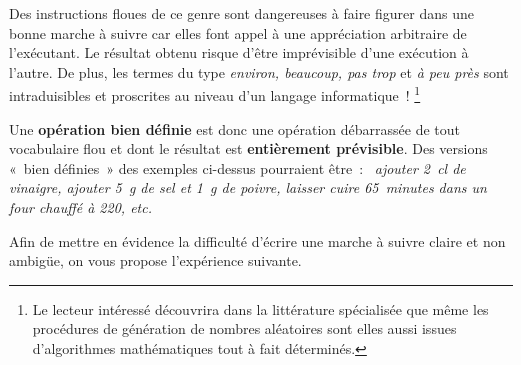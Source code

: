 			Des instructions floues de ce genre 
			sont dangereuses à faire figurer dans une bonne marche à suivre 
			car elles font appel à une appréciation arbitraire de l’exécutant. 
			Le résultat obtenu risque d’être imprévisible 
			d’une exécution à l’autre. 
			De plus, les termes du type \textit{environ, beaucoup, pas trop} 
			et \textit{à peu près} sont intraduisibles 
			et proscrites au niveau d’un langage informatique~!%
			\footnote{%
				Le lecteur intéressé découvrira 
				dans la littérature spécialisée 
				que même les procédures de génération de nombres aléatoires
				sont elles aussi issues d’algorithmes mathématiques 
				tout à fait déterminés.
			}
			
			Une \textbf{opération bien définie} 
			est donc une opération débarrassée
			de tout vocabulaire flou 
			et dont le résultat est \textbf{entièrement prévisible}. 
			Des versions «~bien définies~» des exemples ci-dessus
			pourraient être~:~
			\textit{ajouter 2~cl de vinaigre, ajouter 5~g de sel
			et 1~g de poivre, 
			laisser cuire 65~minutes dans un four chauffé à 220\degre, etc.}
	
			Afin de mettre en évidence la difficulté d’écrire une
			marche à suivre claire et non ambigüe, on vous propose
			l’expérience suivante.
	
